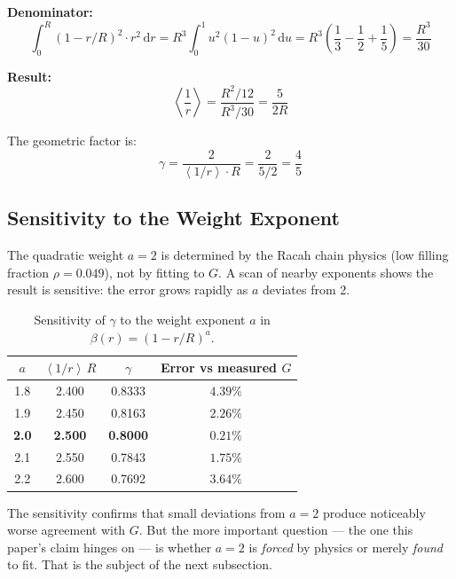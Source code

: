 \documentclass[11pt,letterpaper]{article}
\newcommand{\av}[1]{\left\langle #1 \right\rangle}
\begin{document}
\noindent\textbf{Denominator:}
\begin{equation}
  \int_0^R (1 - r/R)^2 \cdot r^2 \, \mathrm{d}r
  = R^3 \int_0^1 u^2(1-u)^2 \, \mathrm{d}u
  = R^3 \left(\frac{1}{3} - \frac{1}{2} + \frac{1}{5}\right)
  = \frac{R^3}{30}
  \label{eq:denominator}
\end{equation}

\noindent\textbf{Result:}
\begin{equation}
  \av{\frac{1}{r}} = \frac{R^2/12}{R^3/30} = \frac{5}{2R}
  \label{eq:avg_result}
\end{equation}

The geometric factor is:
\begin{equation}
  \gamma = \frac{2}{\av{1/r} \cdot R} = \frac{2}{5/2} = \frac{4}{5}
  \label{eq:gamma}
\end{equation}

\subsection{Sensitivity to the Weight Exponent}

The quadratic weight $a = 2$ is determined by the Racah chain physics
(low filling fraction $\rho = 0.049$), not by fitting to $G$. A scan
of nearby exponents shows the result is sensitive: the error grows
rapidly as $a$ deviates from 2.

\begin{table}[H]
  \centering
  \caption[Sensitivity to weight exponent]{Sensitivity of $\gamma$ to the weight exponent $a$ in $\beta(r) = (1-r/R)^a$.}
  \label{tab:sensitivity}
  \begin{tabular}{cccc}
    \toprule
    $a$ & $\av{1/r}\,R$ & $\gamma$ & Error vs measured $G$ \\
    \midrule
    1.8 & 2.400 & 0.8333 & $4.39\%$ \\
    1.9 & 2.450 & 0.8163 & $2.26\%$ \\
    \textbf{2.0} & \textbf{2.500} & \textbf{0.8000} & \textbf{$0.21\%$} \\
    2.1 & 2.550 & 0.7843 & $1.75\%$ \\
    2.2 & 2.600 & 0.7692 & $3.64\%$ \\
    \bottomrule
  \end{tabular}
\end{table}

The sensitivity confirms that small deviations from $a = 2$ produce
noticeably worse agreement with $G$. But the more important
question --- the one this paper's claim hinges on --- is whether
$a = 2$ is \emph{forced} by physics or merely \emph{found} to fit.
That is the subject of the next subsection.
\end{document}
